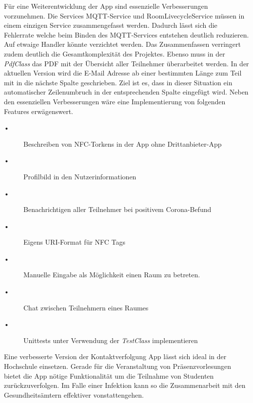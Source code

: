 Für eine Weiterentwicklung der App sind essenzielle Verbesserungen vorzunehmen. Die Services MQTT-Service und RoomLivecycleService müssen in einem einzigen Service zusammengefasst werden. 
Dadurch lässt sich die Fehlerrate welche beim Binden des MQTT-Services entstehen deutlich reduzieren. Auf etwaige Handler könnte verzichtet werden. 
Das Zusammenfassen verringert zudem deutlich die Gesamtkomplexität des Projektes.
 Ebenso muss in der \textit{PdfClass} das PDF mit der Übersicht aller Teilnehmer überarbeitet werden. 
 In der aktuellen Version wird die E-Mail Adresse ab einer bestimmten Länge zum Teil mit in die nächste Spalte geschrieben.
 Ziel ist es, dass in dieser Situation ein automatischer Zeilenumbruch in der entsprechenden Spalte eingefügt wird.
Neben den essenziellen Verbesserungen  wäre eine Implementierung von folgenden Features erwägenswert.
\begin{description}
\item[•]Beschreiben von NFC-Torkens in der App ohne Drittanbieter-App 
\item[•]Profilbild in den Nutzerinformationen
\item[•]Benachrichtigen aller Teilnehmer bei positivem Corona-Befund
\item[•]Eigens URI-Format für NFC Tags
\item[•]Manuelle Eingabe als Möglichkeit einen Raum zu betreten.
\item[•]Chat zwischen Teilnehmern eines Raumes
\item[•]Unittests unter Verwendung der \textit{TestClass} implementieren
\end{description}


Eine verbesserte Version der Kontaktverfolgung App lässt sich ideal in der Hochschule einsetzen. 
Gerade für die Veranstaltung von Präsenzvorlesungen bietet die App nötige Funktionalität um die Teilnahme von Studenten zurückzuverfolgen.
Im Falle einer Infektion kann so die Zusammenarbeit mit den Gesundheitsämtern effektiver von­stat­ten­ge­hen.